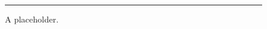 \documentclass{article}
\begin{document}
\begin{minipage}{0.45\linewidth}
  \begin{figure}
    \centering
    \rule{3cm}{2cm}
    \caption{A placeholder.}
  \end{figure}
\end{minipage}
\end{document}
